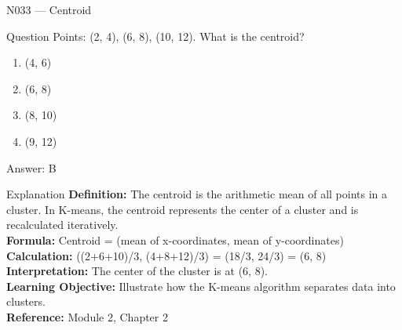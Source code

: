 \documentclass[aspectratio=169,8pt]{beamer}
\begin{document}
	\begin{frame}{N033 --- Centroid}
		\begin{block}{Question}
			Points: (2, 4), (6, 8), (10, 12). What is the centroid?
			\begin{enumerate}
				\item (4, 6)
				\item (6, 8)
				\item (8, 10)
				\item (9, 12)
			\end{enumerate}
		\end{block}
		\begin{exampleblock}{Answer: B}\end{exampleblock}
		\begin{block}{Explanation}
			\textbf{Definition:} The centroid is the arithmetic mean of all points in a cluster. In K-means, the centroid represents the center of a cluster and is recalculated iteratively.\\
			\textbf{Formula:} Centroid = (mean of x-coordinates, mean of y-coordinates)\\
			\textbf{Calculation:} ((2+6+10)/3, (4+8+12)/3) = (18/3, 24/3) = (6, 8)\\
			\textbf{Interpretation:} The center of the cluster is at (6, 8).\\
			\textbf{Learning Objective:} Illustrate how the K-means algorithm separates data into clusters.\\
			\textbf{Reference:} Module 2, Chapter 2
		\end{block}
	\end{frame}
	
\end{document}
